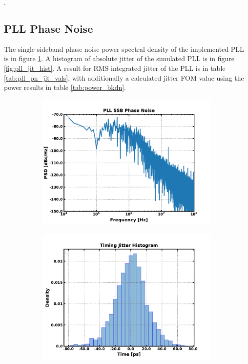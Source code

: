 {\color{white}.}
\FloatBarrier


\subsection{PLL Phase Noise}
The single sideband phase noise power spectral density of the implemented PLL is in figure \ref{fig:sim_pll_psd}. A histogram of absolute jitter of the simulated PLL is in figure \ref{fig:pll_jit_hist}. A result for RMS integrated jitter of the PLL is in table \ref{tab:pll_pn_jit_vals}, with additionally a calculated jitter FOM value using the power results in table \ref{tab:power_bkdn}.
	\begin{figure}[htb!]
	    \centering
	    \begin{subfigure}{0.5\textwidth}
	        \centering
	        \includegraphics[width=1\textwidth, angle=0]{./figs/results/pll_pn_final_100u}
	        \caption{ }
	        \label{fig:sim_pll_psd}
	    \end{subfigure}%
	    \begin{subfigure}{0.5\textwidth}
	        \centering
	        \includegraphics[width=1\textwidth, angle=0]{./figs/results/jitter_hist}

\end{subfigure}
\end{figure}
